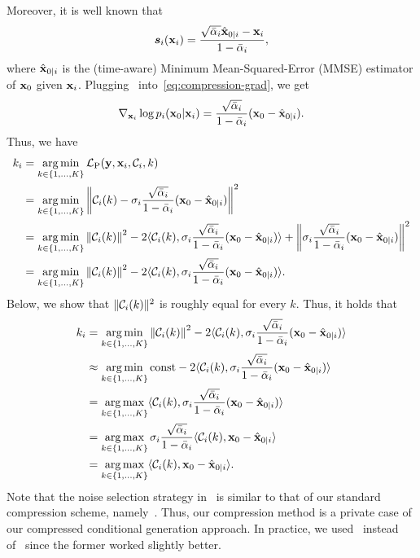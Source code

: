 Moreover, it is well known that~\citep{ho2020denoising,song2020score}
\begin{align}
    {\bm{s}}_{i}({\mathbf{x}}_{i})=\frac{\sqrt{\bar{\alpha}_{i}}\hat{{\mathbf{x}}}_{0|i}-{\mathbf{x}}_{i}}{1-\bar{\alpha}_{i}},\label{eq:score-mmse-in-vp-sde}
\end{align}
where $\hat{{\mathbf{x}}}_{0|i}$ is the (time-aware) Minimum Mean-Squared-Error (MMSE) estimator of ${\mathbf{x}}_{0}$ given ${\mathbf{x}}_{i}$.
Plugging~ into~\cref{eq:compression-grad}, we get
\begin{align}
    \nabla_{{\mathbf{x}}_{i}}\log{p_{i}({\mathbf{x}}_{0}|{\mathbf{x}}_{i})}=\frac{\sqrt{\bar{\alpha}_{i}}}{1-\bar{\alpha}_{i}}({\mathbf{x}}_{0}-\hat{{\mathbf{x}}}_{0|i}).\label{eq:compression_vp_sde_likelihood}
\end{align}
Thus, we have
\begin{align}
    k_{i}&=\operatorname*{arg\,min}_{k\in\{1,\hdots,K\}}{\mathcal{L}}_{\text{P}}({\mathbf{y}},{\mathbf{x}}_{i},{\mathcal{C}}_{i},k)\label{eq:compression_posterior}\\
    &=\operatorname*{arg\,min}_{k\in\{1,\hdots,K\}}\left\lVert{\mathcal{C}}_{i}(k)-\sigma_{i}\frac{\sqrt{\bar{\alpha}_{i}}}{1-\bar{\alpha}_{i}}({\mathbf{x}}_{0}-\hat{{\mathbf{x}}}_{0|i})\right\rVert^{2}\\
    &=\operatorname*{arg\,min}_{k\in\{1,\hdots,K\}}\left\lVert{\mathcal{C}}_{i}(k)\right\rVert^{2}-2\langle{\mathcal{C}}_{i}(k),\sigma_{i}\frac{\sqrt{\bar{\alpha}_{i}}}{1-\bar{\alpha}_{i}}({\mathbf{x}}_{0}-\hat{{\mathbf{x}}}_{0|i})\rangle+\left\lVert\sigma_{i}\frac{\sqrt{\bar{\alpha}_{i}}}{1-\bar{\alpha}_{i}}({\mathbf{x}}_{0}-\hat{{\mathbf{x}}}_{0|i})\right\rVert^{2}\\
    &=\operatorname*{arg\,min}_{k\in\{1,\hdots,K\}}\left\lVert{\mathcal{C}}_{i}(k)\right\rVert^{2}-2\langle{\mathcal{C}}_{i}(k),\sigma_{i}\frac{\sqrt{\bar{\alpha}_{i}}}{1-\bar{\alpha}_{i}}({\mathbf{x}}_{0}-\hat{{\mathbf{x}}}_{0|i})\rangle.
\end{align}
Below, we show that $\lVert{\mathcal{C}}_{i}(k)\rVert^{2}$ is roughly equal for every $k$.
Thus, it holds that
\begin{align}
    k_{i}&=\operatorname*{arg\,min}_{k\in\{1,\hdots,K\}}\left\lVert{\mathcal{C}}_{i}(k)\right\rVert^{2}-2\langle{\mathcal{C}}_{i}(k),\sigma_{i}\frac{\sqrt{\bar{\alpha}_{i}}}{1-\bar{\alpha}_{i}}({\mathbf{x}}_{0}-\hat{{\mathbf{x}}}_{0|i})\rangle\\
    &\approx\operatorname*{arg\,min}_{k\in\{1,\hdots,K\}}\text{const}-2\langle{\mathcal{C}}_{i}(k),\sigma_{i}\frac{\sqrt{\bar{\alpha}_{i}}}{1-\bar{\alpha}_{i}}({\mathbf{x}}_{0}-\hat{{\mathbf{x}}}_{0|i})\rangle\\
    &=\operatorname*{arg\,max}_{k\in\{1,\hdots,K\}}\langle{\mathcal{C}}_{i}(k),\sigma_{i}\frac{\sqrt{\bar{\alpha}_{i}}}{1-\bar{\alpha}_{i}}({\mathbf{x}}_{0}-\hat{{\mathbf{x}}}_{0|i})\rangle\\
    &=\operatorname*{arg\,max}_{k\in\{1,\hdots,K\}}\sigma_{i}\frac{\sqrt{\bar{\alpha}_{i}}}{1-\bar{\alpha}_{i}}\langle{\mathcal{C}}_{i}(k),{\mathbf{x}}_{0}-\hat{{\mathbf{x}}}_{0|i}\rangle\\
    &=\operatorname*{arg\,max}_{k\in\{1,\hdots,K\}}\langle{\mathcal{C}}_{i}(k),{\mathbf{x}}_{0}-\hat{{\mathbf{x}}}_{0|i}\rangle.\label{eq:equiv_kstar_compression}
\end{align}
Note that the noise selection strategy in~ is similar to that of our standard compression scheme, namely~.
Thus, our compression method is a private case of our compressed conditional generation approach.
In practice, we used~ instead of~ since the former worked slightly better.


